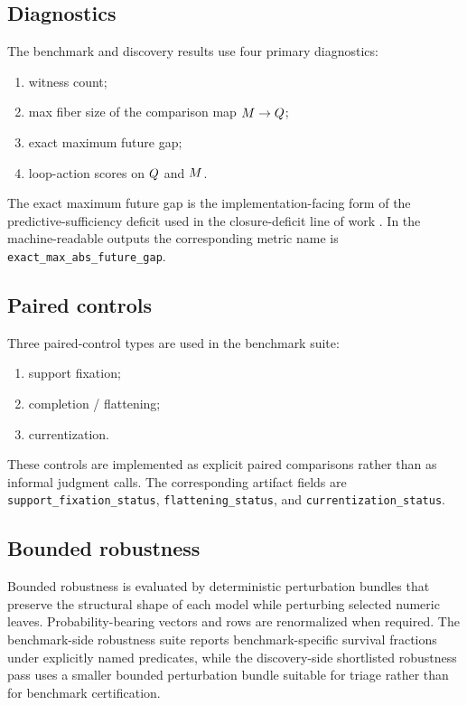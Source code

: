 \documentclass[11pt]{article}
\theoremstyle{definition}
\begin{document}
\subsection{Diagnostics}\label{appsubsec:comp-diagnostics}
The benchmark and discovery results use four primary diagnostics:
\begin{enumerate}
\item witness count;
\item max fiber size of the comparison map $M \to Q$;
\item exact maximum future gap;
\item loop-action scores on $Q$ and $M$.
\end{enumerate}
The exact maximum future gap is the implementation-facing form of the predictive-sufficiency deficit used in the closure-deficit line of work \citep{Tsiokos2026CastStone}. In the machine-readable outputs the corresponding metric name is \nolinkurl{exact_max_abs_future_gap}.

\subsection{Paired controls}\label{appsubsec:comp-controls}
Three paired-control types are used in the benchmark suite:
\begin{enumerate}
\item support fixation;
\item completion / flattening;
\item currentization.
\end{enumerate}
These controls are implemented as explicit paired comparisons rather than as informal judgment calls. The corresponding artifact fields are \nolinkurl{support_fixation_status}, \texttt{flattening\_status}, and \texttt{currentization\_status}.

\subsection{Bounded robustness}\label{appsubsec:comp-robustness}
Bounded robustness is evaluated by deterministic perturbation bundles that preserve the structural shape of each model while perturbing selected numeric leaves. Probability-bearing vectors and rows are renormalized when required. The benchmark-side robustness suite reports benchmark-specific survival fractions under explicitly named predicates, while the discovery-side shortlisted robustness pass uses a smaller bounded perturbation bundle suitable for triage rather than for benchmark certification.
\end{document}
